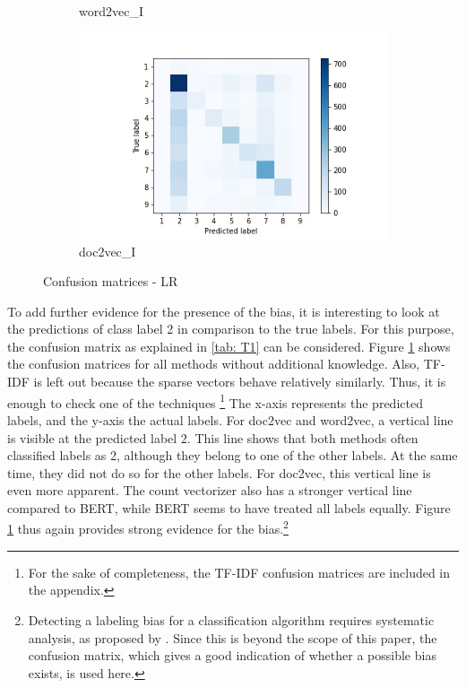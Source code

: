 \documentclass[12pt, a4paper, titlepage]{article}
\begin{document}
\begin{figure}
\begin{subfigure}[b]{0.475\textwidth}
    {{\small word2vec\_I}}    
  \end{subfigure}
  \hfill
  \begin{subfigure}[b]{0.475\textwidth}   
      \centering 
      \includegraphics[width=\textwidth]{cm_doc2vec_without_LR.jpg}
      {{\small doc2vec\_I}}    
  \end{subfigure}
  \caption{\label{fig: F17} Confusion matrices - LR}
\end{figure}

To add further evidence for the presence of the bias, it is interesting to look at the predictions of class label 2 in comparison to the true labels. For this purpose, the confusion matrix as explained in \ref{tab: T1} can be considered. Figure \ref{fig: F17} shows the confusion matrices for all methods without additional knowledge. Also, \ac{TF-IDF} is left out because the sparse vectors behave relatively similarly. Thus, it is enough to check one of the techniques \footnote{For the sake of completeness, the TF-IDF confusion matrices are included in the appendix.} The x-axis represents the predicted labels, and the y-axis the actual labels. For doc2vec and word2vec, a vertical line is visible at the predicted label 2. This line shows that both methods often classified labels as 2, although they belong to one of the other labels. At the same time, they did not do so for the other labels. For doc2vec, this vertical line is even more apparent. The count vectorizer also has a stronger vertical line compared to \ac{BERT}, while \ac{BERT} seems to have treated all labels equally. Figure \ref{fig: F17} thus again provides strong evidence for the bias.\footnote{Detecting a labeling bias for a classification algorithm requires systematic analysis, as proposed by \citet{jiang2020}. Since this is beyond the scope of this paper, the confusion matrix, which gives a good indication of whether a possible bias exists,
is used here.}
\end{document}
